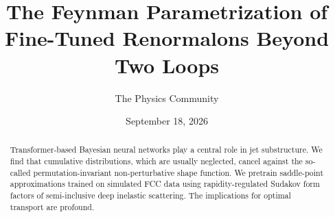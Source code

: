 \documentclass[11pt]{article}
\title{The Feynman Parametrization of Fine-Tuned Renormalons Beyond Two Loops}
\author{The Physics Community}
\date{September 18, 2026}
\begin{document}
\maketitle
\begin{abstract}
Transformer-based Bayesian neural networks play a central role in jet
substructure. We find that cumulative distributions, which are usually
neglected, cancel against the so-called permutation-invariant
non-perturbative shape function. We pretrain saddle-point approximations
trained on simulated FCC data using rapidity-regulated Sudakov form
factors of semi-inclusive deep inelastic scattering. The implications
for optimal transport are profound.
\end{abstract}
\tableofcontents





\nocite{*}


\end{document}
